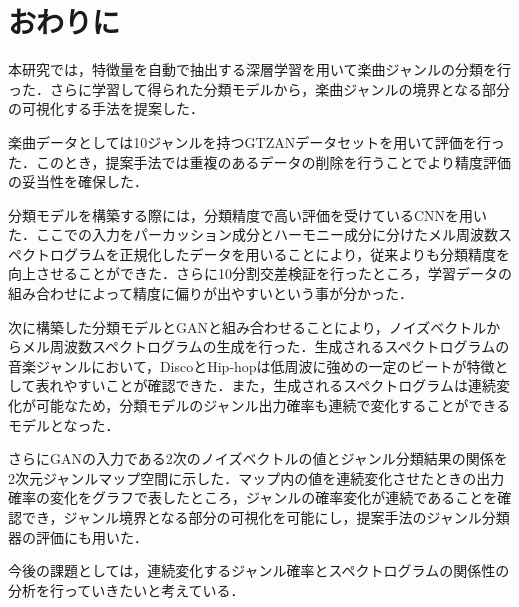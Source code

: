 \chapter{おわりに}
本研究では，特徴量を自動で抽出する深層学習を用いて楽曲ジャンルの分類を行った．さらに学習して得られた分類モデルから，楽曲ジャンルの境界となる部分の可視化する手法を提案した．


楽曲データとしては10ジャンルを持つGTZANデータセットを用いて評価を行った．このとき，提案手法では重複のあるデータの削除を行うことでより精度評価の妥当性を確保した．


分類モデルを構築する際には，分類精度で高い評価を受けているCNNを用いた．ここでの入力をパーカッション成分とハーモニー成分に分けたメル周波数スペクトログラムを正規化したデータを用いることにより，従来よりも分類精度を向上させることができた．さらに10分割交差検証を行ったところ，学習データの組み合わせによって精度に偏りが出やすいという事が分かった．

次に構築した分類モデルとGANと組み合わせることにより，ノイズベクトルからメル周波数スペクトログラムの生成を行った．生成されるスペクトログラムの音楽ジャンルにおいて，DiscoとHip-hopは低周波に強めの一定のビートが特徴として表れやすいことが確認できた．また，生成されるスペクトログラムは連続変化が可能なため，分類モデルのジャンル出力確率も連続で変化することができるモデルとなった．


さらにGANの入力である2次のノイズベクトルの値とジャンル分類結果の関係を2次元ジャンルマップ空間に示した．マップ内の値を連続変化させたときの出力確率の変化をグラフで表したところ，ジャンルの確率変化が連続であることを確認でき，ジャンル境界となる部分の可視化を可能にし，提案手法のジャンル分類器の評価にも用いた．


今後の課題としては，連続変化するジャンル確率とスペクトログラムの関係性の分析を行っていきたいと考えている．